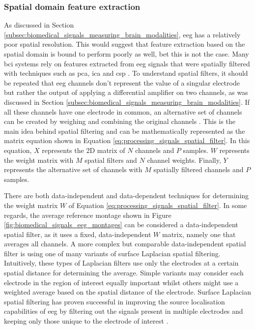 
\subsubsection{Spatial domain feature extraction}
\label{subsubsec:processing_signals_general_pipeline_features_spatialdomain}

As discussed in Section \ref{subsec:biomedical_signals_measuring_brain_modalities}, \gls{eeg} has a relatively poor spatial resolution.
This would suggest that feature extraction based on the spatial domain is bound to perform poorly as well, bet this is not the case.
Many \gls{bci} systems rely on features extracted from \gls{eeg} signals that were spatially filtered with techniques such as \gls{pca}, \gls{ica} and \gls{csp} \citep{bci_book}.
To understand spatial filters, it should be repeated that \gls{eeg} channels don't represent the value of a singular electrode but rather the output of applying a differential amplifier on two channels, as was discussed in Section \ref{subsec:biomedical_signals_measuring_brain_modalities}.
If all these channels have one electrode in common, an alternative set of channels can be created by weighing and combining the original channels \citep{bci_book}.
This is the main idea behind spatial filtering and can be mathematically represented as the matrix equation shown in Equation \ref{eq:processing_signals_spatial_filter}.
In this equation, $X$ represents the 2D matrix of $N$ channels and $P$ samples.
$W$ represents the weight matrix with $M$ spatial filters and $N$ channel weights.
Finally, $Y$ represents the alternative set of channels with $M$ spatially filtered channels and $P$ samples.

There are both data-independent and data-dependent techniques for determining the weight matrix $W$ of Equation \ref{eq:processing_signals_spatial_filter}.
In some regards, the average reference montage shown in Figure \ref{fig:biomedical_signals_eeg_montages} can be considered a data-independent spatial filter, as it uses a fixed, data-independent $W$ matrix, namely one that averages all channels.
A more complex but comparable data-independent spatial filter is using one of many variants of surface Laplacian spatial filtering.
Intuitively, these types of Laplacian filters use only the electrodes at a certain spatial distance for determining the average.
Simple variants may consider each electrode in the region of interest equally important whilst others might use a weighted average based on the spatial distance of the electrode.
Surface Laplacian spatial filtering has proven successful in improving the source localisation capabilities of \gls{eeg} by filtering out the signals present in multiple electrodes and keeping only those unique to the electrode of interest \citep{improve_eeg_spatial_laplacian1, improve_eeg_spatial_laplacian2, improve_eeg_spatial_laplacian3}.


